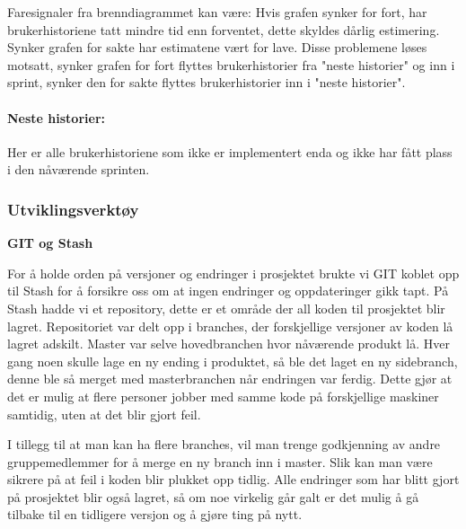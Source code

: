 \documentclass[12pt,a4paper,norsk]{article}
\begin{document}
    Faresignaler fra brenndiagrammet kan være: Hvis grafen synker for fort, har brukerhistoriene tatt mindre tid enn forventet, dette skyldes dårlig estimering. Synker grafen for sakte har estimatene vært for lave. Disse problemene løses motsatt, synker grafen for fort flyttes brukerhistorier fra "neste historier" og inn i sprint, synker den for sakte flyttes brukerhistorier inn i "neste historier".

    \paragraph{Neste historier:}
    Her er alle brukerhistoriene som ikke er implementert enda og ikke har fått plass i den nåværende sprinten.

    \cite [side 72 -78]{kniberg}


  \subsubsection{Utviklingsverktøy}


\bigskip \noindent \textbf{GIT og Stash}
\par For å holde orden på versjoner og endringer i prosjektet brukte vi GIT koblet opp til Stash for å forsikre oss om at ingen endringer og oppdateringer gikk tapt. På Stash hadde vi et repository, dette er et område der all koden til prosjektet blir lagret. Repositoriet var delt opp i branches, der forskjellige versjoner av koden lå lagret adskilt. Master var selve hovedbranchen hvor nåværende produkt lå. Hver gang noen skulle lage en ny ending i produktet, så ble det laget en ny sidebranch, denne ble så merget med masterbranchen når endringen var ferdig. Dette gjør at det er mulig at flere personer jobber med samme kode på forskjellige maskiner samtidig, uten at det blir gjort feil.

I tillegg til at man kan ha flere branches, vil man trenge godkjenning av andre gruppemedlemmer for å merge en ny branch inn i master. Slik kan man være sikrere på at feil i koden blir plukket opp tidlig. Alle endringer som har blitt gjort på prosjektet blir også lagret, så om noe virkelig går galt er det mulig å gå tilbake til en tidligere versjon og å gjøre ting på nytt.
\end{document}
